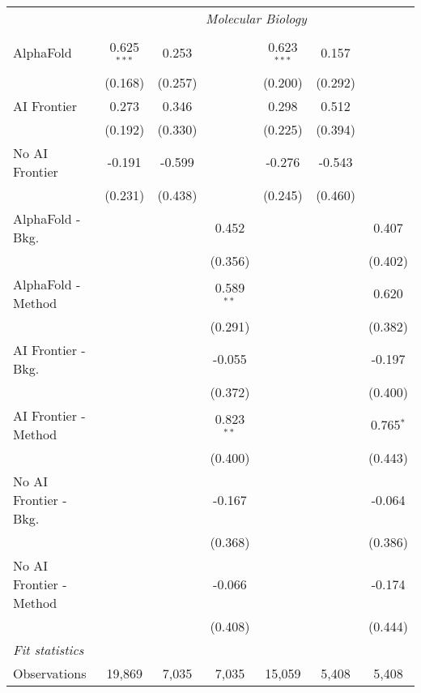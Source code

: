 \begin{tabular}{lcccccc}
 & \multicolumn{6}{c}{\textit{Molecular Biology}} \\ \\
   AlphaFold               & 0.625$^{***}$ & 0.253   &              & 0.623$^{***}$ & 0.157   &   \\   
                           & (0.168)       & (0.257) &              & (0.200)       & (0.292) &   \\   
   AI Frontier             & 0.273         & 0.346   &              & 0.298         & 0.512   &   \\   
                           & (0.192)       & (0.330) &              & (0.225)       & (0.394) &   \\   
   No AI Frontier          & -0.191        & -0.599  &              & -0.276        & -0.543  &   \\   
                           & (0.231)       & (0.438) &              & (0.245)       & (0.460) &   \\   
   AlphaFold - Bkg.        &               &         & 0.452        &               &         & 0.407\\   
                           &               &         & (0.356)      &               &         & (0.402)\\   
   AlphaFold - Method      &               &         & 0.589$^{**}$ &               &         & 0.620\\   
                           &               &         & (0.291)      &               &         & (0.382)\\   
   AI Frontier - Bkg.      &               &         & -0.055       &               &         & -0.197\\   
                           &               &         & (0.372)      &               &         & (0.400)\\   
   AI Frontier - Method    &               &         & 0.823$^{**}$ &               &         & 0.765$^{*}$\\   
                           &               &         & (0.400)      &               &         & (0.443)\\   
   No AI Frontier - Bkg.   &               &         & -0.167       &               &         & -0.064\\   
                           &               &         & (0.368)      &               &         & (0.386)\\   
   No AI Frontier - Method &               &         & -0.066       &               &         & -0.174\\   
                           &               &         & (0.408)      &               &         & (0.444)\\   
   \midrule
   \emph{Fit statistics}\\
   Observations            & 19,869        & 7,035   & 7,035        & 15,059        & 5,408   & 5,408\\  
   

\end{tabular}
